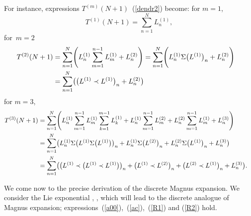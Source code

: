 \documentclass[pdftex]{sigma}
\numberwithin{equation}{section}
\theoremstyle{definition}
\begin{document}
For instance, expressions $T^{(m)}(N+1)$~(\ref{dendr2}) become: for $m=1$,
\[
T^{(1)}(N+1)= \sum_{n=1}^N L^{(1)}_n,
\]
for~${m=2}$
\begin{align*}
T^{(2)}(N+1) &= \sum_{n=1}^N \Biggl(L^{(1)}_n \sum_{m=1}^{n-1} L^{(1)}_m + L^{(2)}_n \Biggr)= \sum_{n=1}^N \Biggl(L^{(1)}_n \Sigma\bigl(L^{(1)}\bigr)_n + L^{(2)}_n \Biggr)\cr
&=
 \sum_{n=1}^N \bigl( \bigl(L^{(1)} \prec L^{(1)}\bigr)_n + L_n^{(2)}\bigr)\nonumber
\end{align*}
for $m=3$,
\begin{align*}
T^{(3)}(N+1) &= \sum_{n=1}^N\Biggl( L^{(1)}_n \sum_{m=1}^{n-1} L^{(1)}_m \sum_{k=1}^{m-1} L^{(1)}_k + L^{(1)}_n \sum_{m=1}^{n-1} L^{(2)}_m + L^{(2)}_n \sum_{m=1}^{n-1}L^{(1)}_m + L_n^{(3)}\Biggr)\cr
&= \sum_{n=1}^N \bigl(L^{(1)}_n \Sigma\bigl(L^{(1)}\Sigma\bigl(L^{(1)}\bigr)\bigr)_n +L^{(1)}_n \Sigma\bigl(L^{(2)}\bigr)_n +L_n^{(2)}\Sigma\bigl(L^{(1)}\bigr)_n +L_n^{(3)} \bigr)
\cr
&=
 \sum_{n=1}^N \bigl( \bigl(L^{(1)} \prec \bigl(L^{(1)}\prec L^{(1)}\bigr)\bigr)_n +\bigl(L^{(1)}\prec L^{(2)} \bigr)_n +
\bigl(L^{(2)} \prec L^{(1)}\bigr)_n + L_n^{(3)}\bigr). \nonumber
\end{align*}

We come now to the precise derivation of the discrete Magnus expansion. We consider the Lie exponential , , which will lead to the discrete analogue of Magnus expansion; expressions~(\ref{a00}),~(\ref{ac}),~(\ref{R1}) and (\ref{R2}) hold.
\end{document}
